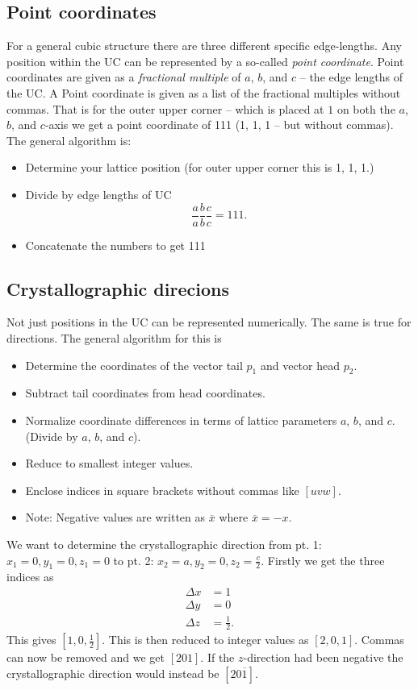 \subsection{Point coordinates}
For a general cubic structure there are three different specific edge-lengths. Any position within the UC can be represented by a so-called \textit{point coordinate}. Point coordinates are given as a \textit{fractional multiple} of $a$, $b$, and $c$ -- the edge lengths of the UC. A Point coordinate is given as a list of the fractional multiples without commas. That is for the outer upper corner -- which is placed at $1$ on both the $a$, $b$, and $c$-axis we get a point coordinate of 111 (1, 1, 1 -- but without commas). The general algorithm is:
\begin{itemize}
  \item Determine your lattice position (for outer upper corner this is 1, 1, 1.)
  \item Divide by edge lengths of UC
\[ 
\frac{a}{a} \frac{b}{b} \frac{c}{c} = 1 1 1
.\]
  \item Concatenate the numbers to get 111
\end{itemize}

\subsection{Crystallographic direcions}
Not just positions in the UC can be represented numerically. The same is true for directions. The general algorithm for this is
\begin{itemize}
  \item Determine the coordinates of the vector tail $p_1$ and vector head $p_2$.
  \item Subtract tail coordinates from head coordinates.
  \item Normalize coordinate differences in terms of lattice parameters $a$, $b$, and $c$. (Divide by $a$, $b$, and $c$).
  \item Reduce to smallest integer values.
  \item Enclose indices in square brackets without commas like $[uvw]$.
  \item Note: Negative values are written as $\overline{x}$ where $\overline{x} = -x$.
\end{itemize}

\begin{exa}
  We want to determine the crystallographic direction from pt. 1: $x_1 = 0, y_1 = 0, z_1 = 0$ to pt. 2: $x_2 = a, y_2 = 0, z_2 = \frac{c}{2}$.
  \bigbreak
  Firstly we get the three indices as
  \begin{align*}
    \Delta x &= 1\\
    \Delta y &= 0 \\
    \Delta z &= \frac{1}{2}
  .\end{align*}
  This gives $[1, 0, \frac{1}{2}]$. This is then reduced to integer values as $[2, 0, 1]$. Commas can now be removed and we get $[201]$. If the $z$-direction had been negative the crystallographic direction would instead be $\left[ 2 0 \overline{1} \right]$.
\end{exa}

